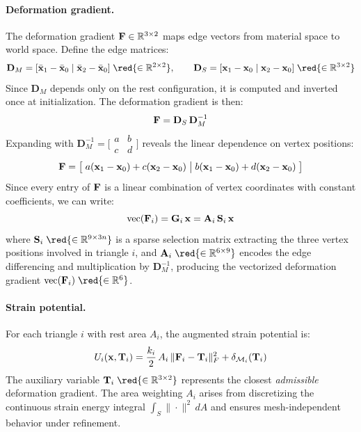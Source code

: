 \paragraph{Deformation gradient.} The deformation gradient $\mathbf{F} \in \mathbb{R}^{3\times 2}$ maps edge vectors from material space to world space. Define the edge matrices:
\begin{equation*}
    \mathbf{D}_M = [\bar{\x}_1 - \bar{\x}_0 \mid \bar{\x}_2 - \bar{\x}_0 ]\; \red{\in \RR^{2 \times 2}}, \qquad
    \mathbf{D}_S = [\x_1 - \x_0 \mid \x_2 - \x_0 ]\; \red{\in \RR^{3 \times 2}}
\end{equation*}
Since $\mathbf{D}_M$ depends only on the rest configuration, it is computed and inverted once at initialization. The deformation gradient is then:
\begin{equation}
    \mathbf{F} = \mathbf{D}_S\,\mathbf{D}_M^{-1}
\end{equation}
Expanding with $\mathbf{D}_M^{-1} = \bigl[\begin{smallmatrix} a & b \\ c & d \end{smallmatrix}\bigr]$ reveals the linear dependence on vertex positions:
\begin{equation}
    \mathbf{F} = \bigl[\;
        a(\mathbf{x}_1 - \mathbf{x}_0) + c(\mathbf{x}_2 - \mathbf{x}_0) 
        \;\big|\;
        b(\mathbf{x}_1 - \mathbf{x}_0) + d(\mathbf{x}_2 - \mathbf{x}_0)
    \;\bigr]
\end{equation}
Since every entry of $\mathbf{F}$ is a linear combination of vertex coordinates with constant coefficients, we can write:
\begin{equation}
    \operatorname{vec}(\mathbf{F}_i) = \mathbf{G}_i\,\mathbf{x} = \mathbf{A}_i\,\mathbf{S}_i\,\mathbf{x}
\end{equation}
where $\Sb_i\; \red{\in \RR^{9\times 3n}}$ is a sparse selection matrix extracting the three vertex positions involved in triangle $i$, and $\A_i\; \red{\in \RR^{6\times 9}}$ encodes the edge differencing and multiplication by $\mathbf{D}_M^{-1}$, producing the vectorized deformation gradient $\operatorname{vec}(\F_i)\; \red{\in \RR^{6}}$.

\paragraph{Strain potential.} For each triangle $i$ with rest area $A_i$, the augmented strain potential is:
\begin{equation}
    U_i(\mathbf{x}, \mathbf{T}_i) = \frac{k_i}{2}\,A_i\,\|\mathbf{F}_i - \mathbf{T}_i\|^2_F + \delta_{\mathcal{M}_i}(\mathbf{T}_i)
\end{equation}
The auxiliary variable $\mathbf{T}_i\; \red{\in \RR^{3\times 2}}$ represents the closest \emph{admissible} deformation gradient. The area weighting $A_i$ arises from discretizing the continuous strain energy integral $\int_S \|\cdot\|^2\,dA$ and ensures mesh-independent behavior under refinement.

